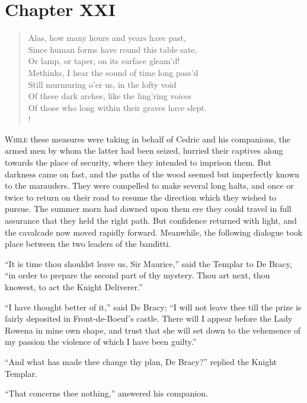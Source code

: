 \chapter{Chapter XXI}

\begin{verse}
Alas, how many hours and years have past,\\
Since human forms have round this table sate,\\
Or lamp, or taper, on its surface gleam'd!\\
Methinks, I hear the sound of time long pass'd\\
Still murmuring o'er us, in the lofty void\\
Of these dark arches, like the ling'ring voices\\
Of those who long within their graves have slept.\\!
\end{verse}

\lettrine{W}{hile} these measures were taking in behalf of Cedric
and his companions,
the armed men by whom the latter had been seized, hurried their captives
along towards the place of security, where they intended to imprison
them. But darkness came on fast, and the paths of the wood seemed but
imperfectly known to the marauders. They were compelled to make several
long halts, and once or twice to return on their road to resume the
direction which they wished to pursue. The summer morn had dawned upon
them ere they could travel in full assurance that they held the right
path. But confidence returned with light, and the cavalcade now moved
rapidly forward. Meanwhile, the following dialogue took place between
the two leaders of the banditti.

``It is time thou shouldst leave us, Sir Maurice,'' said the Templar to
De Bracy, ``in order to prepare the second part of thy mystery. Thou art
next, thou knowest, to act the Knight Deliverer.''

``I have thought better of it,'' said De Bracy; ``I will not leave thee
till the prize is fairly deposited in Front-de-Boeuf's castle. There
will I appear before the Lady Rowena in mine own shape, and trust that
she will set down to the vehemence of my passion the violence of which I
have been guilty.''

``And what has made thee change thy plan, De Bracy?'' replied the Knight
Templar.

``That concerns thee nothing,'' answered his companion.

